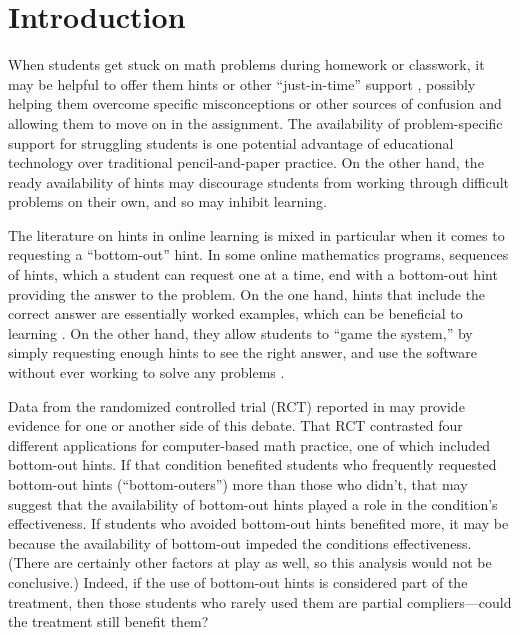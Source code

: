 \documentclass[]{article}
\begin{document}
\clearpage

\section{Introduction}

When students get stuck on math problems during homework or classwork, it may be helpful to offer them hints or other ``just-in-time'' support \cite[e.g][]{jit}, possibly helping them overcome specific misconceptions or other sources of confusion and allowing them to move on in the assignment.
The availability of problem-specific support for struggling students is one potential advantage of educational technology over traditional pencil-and-paper practice.
On the other hand, the ready availability of hints may discourage students from working through difficult problems on their own, and so may inhibit learning.

The literature on hints in online learning is mixed \citep[see, e.g.,][]{aleven2016help,goldin2012learner,sales2021student} in particular when it comes to requesting a ``bottom-out'' hint. In some online mathematics programs, sequences of hints, which a student can request one at a time, end with a bottom-out hint providing the answer to the problem. On the one hand, hints that include the correct answer are essentially worked examples, which can be beneficial to learning \citep[e.g.]{sweller1985use}. On the other hand, they allow students to ``game the system,'' by simply requesting enough hints to see the right answer, and use the software without ever working to solve any problems \citep[e.g.][]{guo2008trying}.

Data from the randomized controlled trial (RCT) reported in \citet{impactPaper} may provide evidence for one or another side of this debate.
That RCT contrasted four different applications for computer-based math practice, one of which included bottom-out hints.
If that condition benefited students who frequently requested bottom-out hints (``bottom-outers'') more than those who didn't, that may suggest that the availability of bottom-out hints played a role in the condition's effectiveness.
If students who avoided bottom-out hints benefited more, it may be because the availability of bottom-out impeded the conditions effectiveness.
(There are certainly other factors at play as well, so this analysis would not be conclusive.)
Indeed, if the use of bottom-out hints is considered part of the treatment, then those students who rarely used them are partial compliers---could the treatment still benefit them?
\end{document}
